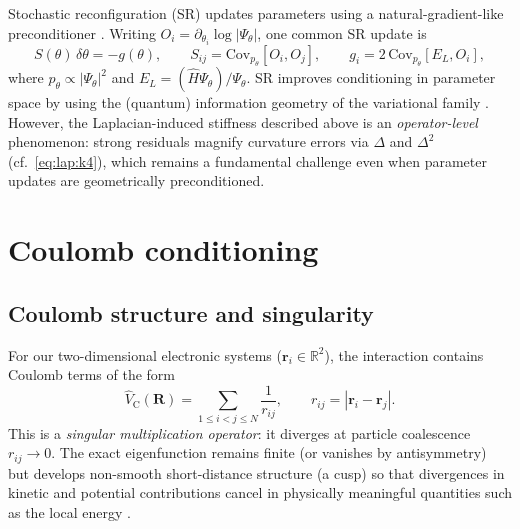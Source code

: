 Stochastic reconfiguration (SR) updates parameters using a natural-gradient-like
preconditioner \cite{BeccaSorella2017-QMCBook,Amari1998-NaturalGradient,ParkKastoryano2020-GeometryNQS}.
Writing $O_i=\partial_{\theta_i}\log|\Psi_\theta|$, one common SR update is
\begin{equation}
S(\theta)\,\delta\theta = -g(\theta),
\qquad
S_{ij}=\mathrm{Cov}_{p_\theta}[O_i,O_j],
\qquad
g_i=2\,\mathrm{Cov}_{p_\theta}[E_L,O_i],
\label{eq:lap:sr}
\end{equation}
where $p_\theta\propto|\Psi_\theta|^2$ and $E_L=(\hat H\Psi_\theta)/\Psi_\theta$.
SR improves conditioning in parameter space by using the (quantum) information
geometry of the variational family \cite{Amari1998-NaturalGradient,ParkKastoryano2020-GeometryNQS}.
However, the Laplacian-induced stiffness described above is an \emph{operator-level}
phenomenon: strong residuals magnify curvature errors via $\Delta$ and $\Delta^2$
(cf.\ \eqref{eq:lap:k4}), which remains a fundamental challenge even when parameter
updates are geometrically preconditioned.



\chapter{Coulomb conditioning}
\label{app:coulomb}

\section{Coulomb structure and singularity}
\label{app:coulomb:setup}

For our two-dimensional electronic systems ($\mathbf r_i\in\mathbb R^2$), the interaction
contains Coulomb terms of the form
\begin{equation}
\hat V_{\mathrm C}(\mathbf R)=\sum_{1\le i<j\le N}\frac{1}{r_{ij}},
\qquad r_{ij}=|\mathbf r_i-\mathbf r_j|.
\label{eq:coulomb:V}
\end{equation}
This is a \emph{singular multiplication operator}: it diverges at particle
coalescence $r_{ij}\to 0$.
The exact eigenfunction remains finite (or vanishes by antisymmetry) but develops
non-smooth short-distance structure (a cusp) so that divergences in kinetic and
potential contributions cancel in physically meaningful quantities such as the
local energy \cite{BeccaSorella2017-QMCBook}.

